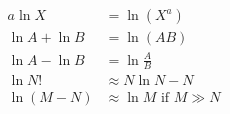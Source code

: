 \begin{align*}
a\ln{X} &= \ln{\left(X^a\right)}\\
\ln{A} + \ln{B} &= \ln{\left(AB\right)}\\
\ln{A} -\ln{B} &= \ln{\frac{A}{B}}\\
\ln{N!}&\approx N \ln{N}-N\\
\ln{\left(M-N\right)}&\approx \ln{M}\textrm{ if }M \gg N\\
\end{align*}